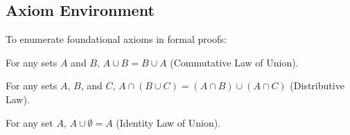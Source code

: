 \documentclass{ltxdoc}
\begin{document}
\subsection{Axiom Environment}

To enumerate foundational axioms in formal proofs:

\begin{axiom}
	\item For any sets $A$ and $B$, $A \cup B = B \cup A$ (Commutative Law of Union).
	\item For any sets $A$, $B$, and $C$, $A \cap (B \cup C) = (A \cap B) \cup (A \cap C)$ (Distributive Law).
	\item For any set $A$, $A \cup \emptyset = A$ (Identity Law of Union).
\end{axiom}
\end{document}
